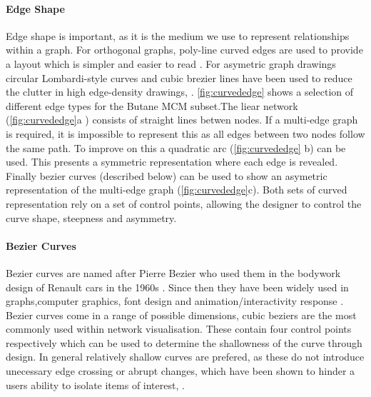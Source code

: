 \paragraph{Edge Shape}
Edge shape is important, as it is the medium we use to represent relationships within a graph. For orthogonal graphs, poly-line curved edges are used to provide a layout which is simpler and easier to read \cite{ortho}. For asymetric graph drawings circular Lombardi-style curves and cubic brezier lines have been used to reduce the clutter in high edge-density drawings, \cite{lombardi,bezier}. \autoref{fig:curvededge} shows a selection of different edge types for the Butane MCM subset.The liear network (\autoref{fig:curvededge}a ) consists of straight lines betwen nodes. If a multi-edge graph is required, it is impossible to represent this as all edges between two nodes follow the same path. To improve on this a quadratic arc (\autoref{fig:curvededge} b) can be used. This presents a symmetric representation where each edge is revealed. Finally bezier curves (described below) can be used to show an asymetric representation of the multi-edge graph (\autoref{fig:curvededge}c). Both sets of curved representation rely on a set of control points, allowing the designer to control the curve shape, steepness and asymmetry. 

\paragraph*{Bezier Curves}
Bezier curves are named after Pierre Bezier who used them in the bodywork design of Renault cars in the 1960s \cite{beziermath}. Since then they have been widely used in graphs,computer graphics, font design and animation/interactivity response \cite{bezier,beziermath,beziercomputer}. Bezier curves come in a range of possible dimensions, cubic beziers are the most commonly used within network visualisation. These contain four control points respectively which can be used to determine the shallowness of the curve through design. In general relatively shallow curves are prefered, as these do not introduce unecessary edge crossing or abrupt changes, which have been shown to hinder a users ability to isolate items of interest, \cite{ch6graphredability}.


